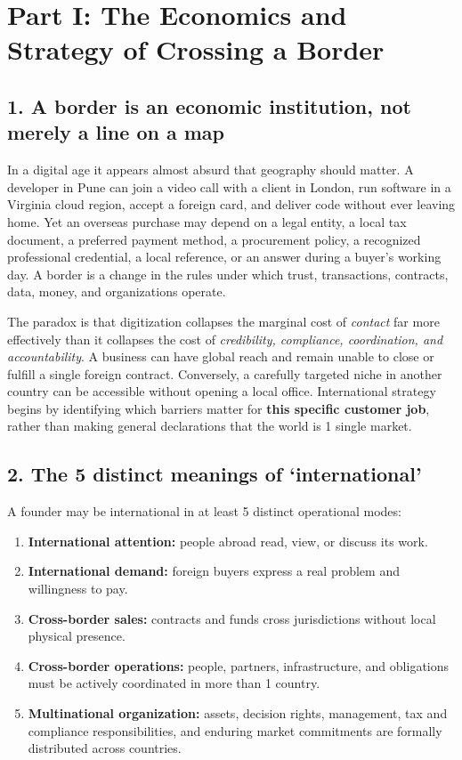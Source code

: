 \section{Part I: The Economics and Strategy of Crossing a Border}

\subsection{1. A border is an economic institution, not merely a line on a map}

In a digital age it appears almost absurd that geography should matter. A developer in Pune can join a video call with a client in London, run software in a Virginia cloud region, accept a foreign card, and deliver code without ever leaving home. Yet an overseas purchase may depend on a legal entity, a local tax document, a preferred payment method, a procurement policy, a recognized professional credential, a local reference, or an answer during a buyer's working day. A border is a change in the rules under which trust, transactions, contracts, data, money, and organizations operate.

The paradox is that digitization collapses the marginal cost of \textit{contact} far more effectively than it collapses the cost of \textit{credibility, compliance, coordination, and accountability}. A business can have global reach and remain unable to close or fulfill a single foreign contract. Conversely, a carefully targeted niche in another country can be accessible without opening a local office. International strategy begins by identifying which barriers matter for \textbf{this specific customer job}, rather than making general declarations that the world is 1 single market.

\subsection{2. The 5 distinct meanings of `international'}

A founder may be international in at least 5 distinct operational modes:
\begin{enumerate}
    \item \textbf{International attention:} people abroad read, view, or discuss its work.
    \item \textbf{International demand:} foreign buyers express a real problem and willingness to pay.
    \item \textbf{Cross-border sales:} contracts and funds cross jurisdictions without local physical presence.
    \item \textbf{Cross-border operations:} people, partners, infrastructure, and obligations must be actively coordinated in more than 1 country.
    \item \textbf{Multinational organization:} assets, decision rights, management, tax and compliance responsibilities, and enduring market commitments are formally distributed across countries.
\end{enumerate}

